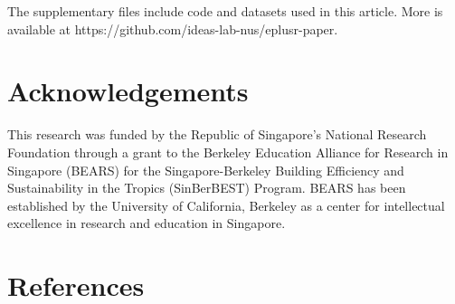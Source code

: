 \documentclass[3p, times]{elsarticle} %
\begin{document}
The supplementary files include code and datasets used in this article. More
is available at https://github.com/ideas-lab-nus/eplusr-paper.

\hypertarget{acknowledgements}{%
\section*{Acknowledgements}\label{acknowledgements}}

This research was funded by the Republic of Singapore's National Research
Foundation through a grant to the Berkeley Education Alliance for Research in
Singapore (BEARS) for the Singapore-Berkeley Building Efficiency and
Sustainability in the Tropics (SinBerBEST) Program. BEARS has been established
by the University of California, Berkeley as a center for intellectual
excellence in research and education in Singapore.

\hypertarget{references}{%
\section*{References}\label{references}}

\hypertarget{refs}{}

\clearpage
\end{document}
